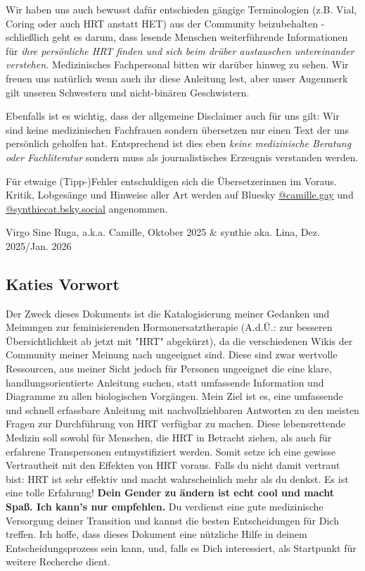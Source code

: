 \documentclass{article}
\begin{document}
Wir haben uns auch bewusst dafür entschieden gängige Terminologien (z.B. Vial, Coring oder auch HRT anstatt HET) aus der Community beizubehalten - schließlich geht es darum, dass lesende Menschen weiterführende Informationen für \textit{ihre persönliche HRT finden und sich beim drüber austauschen untereinander verstehen.} Medizinisches Fachpersonal bitten wir darüber hinweg zu sehen. Wir freuen uns natürlich wenn auch ihr diese Anleitung lest, aber unser Augenmerk gilt unseren Schwestern und nicht-binären Geschwistern. 

Ebenfalls ist es wichtig, dass der allgemeine Disclaimer auch für uns gilt: Wir sind keine medizinischen Fachfrauen sondern übersetzen nur einen Text der uns persönlich geholfen hat. Entsprechend ist dies eben \textit{keine medizinische Beratung oder Fachliteratur} sondern muss als journalistisches Erzeugnis verstanden werden.

Für etwaige (Tipp-)Fehler entschuldigen sich die Übersetzerinnen im Voraus. Kritik, Lobgesänge und Hinweise aller Art werden auf Bluesky \href{https://bsky.app/profile/camille.gay}{@camille.gay} und \href{https://bsky.app/profile/synthiecat.bsky.social}{@synthiecat.bsky.social} angenommen.

Virgo Sine Ruga, a.k.a. Camille, Oktober 2025 \& synthie aka. Lina, Dez. 2025/Jan. 2026

\subsection*{Katies Vorwort}
Der Zweck dieses Dokuments ist die Katalogisierung meiner Gedanken und Meinungen zur feminisierenden Hormonersatztherapie (A.d.Ü.: zur besseren Übersichtlichkeit ab jetzt mit "HRT" abgekürzt), da die verschiedenen Wikis der Community meiner Meinung nach ungeeignet sind. Diese sind zwar wertvolle Ressourcen, aus meiner Sicht jedoch für Personen ungeeignet die eine klare, handlungsorientierte Anleitung suchen, statt umfassende Information und Diagramme zu allen biologischen Vorgängen. Mein Ziel ist es, eine umfassende und schnell erfassbare Anleitung mit nachvollziehbaren Antworten zu den meisten Fragen zur Durchführung von HRT verfügbar zu machen. Diese lebensrettende Medizin soll sowohl für Menschen, die HRT in Betracht ziehen, als auch für erfahrene Transpersonen entmystifiziert werden. Somit setze ich eine gewisse Vertrautheit mit den Effekten von HRT voraus. Falls du nicht damit vertraut bist: HRT ist sehr effektiv und macht wahrscheinlich mehr als du denkst. Es ist eine tolle Erfahrung! \textbf{Dein Gender zu ändern ist echt cool und macht Spaß. Ich kann's nur empfehlen.} Du verdienst eine gute medizinische Versorgung deiner Transition und kannst die besten Entscheidungen für Dich treffen. Ich hoffe, dass dieses Dokument eine nützliche Hilfe in deinem Entscheidungsprozess sein kann, und, falls es Dich interessiert, als Startpunkt für weitere Recherche dient.
\end{document}
